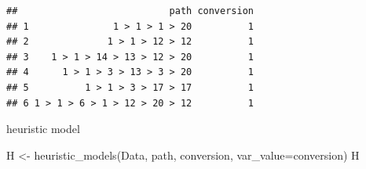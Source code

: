 \documentclass[
]{book}
\newenvironment{Shaded}{\begin{snugshade}}{\end{snugshade}}
\newcommand{\AttributeTok}[1]{\textcolor[rgb]{0.77,0.63,0.00}{#1}}
\newcommand{\FunctionTok}[1]{\textcolor[rgb]{0.00,0.00,0.00}{#1}}
\newcommand{\NormalTok}[1]{#1}
\newcommand{\OtherTok}[1]{\textcolor[rgb]{0.56,0.35,0.01}{#1}}
\newcommand{\StringTok}[1]{\textcolor[rgb]{0.31,0.60,0.02}{#1}}
\begin{document}
\begin{verbatim}
##                           path conversion
## 1               1 > 1 > 1 > 20          1
## 2              1 > 1 > 12 > 12          1
## 3    1 > 1 > 14 > 13 > 12 > 20          1
## 4      1 > 1 > 3 > 13 > 3 > 20          1
## 5          1 > 1 > 3 > 17 > 17          1
## 6 1 > 1 > 6 > 1 > 12 > 20 > 12          1
\end{verbatim}

heuristic model

\begin{Shaded}
\begin{Highlighting}[]
\NormalTok{H }\OtherTok{\textless{}{-}} \FunctionTok{heuristic\_models}\NormalTok{(Data, }\StringTok{\textquotesingle{}path\textquotesingle{}}\NormalTok{, }\StringTok{\textquotesingle{}conversion\textquotesingle{}}\NormalTok{, }\AttributeTok{var\_value=}\StringTok{\textquotesingle{}conversion\textquotesingle{}}\NormalTok{)}
\NormalTok{H}
\end{Highlighting}
\end{Shaded}
\end{document}
